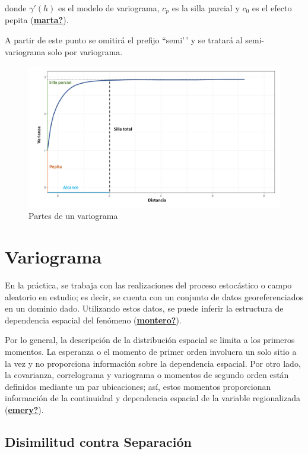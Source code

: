 \documentclass[
]{book}
\begin{document}
donde \(\gamma'(h)\) es el modelo de variograma, \(c_p\) es la silla parcial y \(c_0\) es el efecto pepita (\protect\hyperlink{ref-marta}{\textbf{marta?}}).

A partir de este punto se omitirá el prefijo ``semi'\,' y se tratará al semi-variograma solo por variograma.

\begin{figure}
\includegraphics[width=17.78in]{figuras/otros/variograma_partes} \caption{Partes de un variograma}\label{fig:pvar}
\end{figure}

\hypertarget{variograma}{%
\section{Variograma}\label{variograma}}

En la práctica, se trabaja con las realizaciones del proceso estocástico o campo aleatorio en estudio; es decir, se cuenta con un conjunto de datos georeferenciados en un dominio dado. Utilizando estos datos, se puede inferir la estructura de dependencia espacial del fenómeno (\protect\hyperlink{ref-montero}{\textbf{montero?}}).

Por lo general, la descripción de la distribución espacial se limita a los primeros momentos. La esperanza o el momento de primer orden involucra un solo sitio a la vez y no proporciona información sobre la dependencia espacial. Por otro lado, la covarianza, correlograma y variograma o momentos de segundo orden están definidos mediante un par ubicaciones; así, estos momentos proporcionan información de la continuidad y dependencia espacial de la variable regionalizada (\protect\hyperlink{ref-emery}{\textbf{emery?}}).

\hypertarget{disimilitud-contra-separaciuxf3n}{%
\subsection{Disimilitud contra Separación}\label{disimilitud-contra-separaciuxf3n}}
\end{document}
